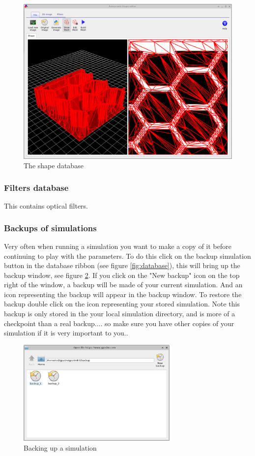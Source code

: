 \begin{figure}[H]
\centering
\includegraphics[width=\textwidth,height=0.7\textwidth]{./images/shape_db.png}
\caption{The shape database}
\label{fig:shapedb}
\end{figure}

\subsubsection{Filters database}
This contains optical filters.

\subsubsection{Backups of simulations}
Very often when running a simulation you want to make a copy of it before continuing to play with the parameters.  To do this click on the backup simulation button in the database ribbon (see figure \ref{fig:database}), this will bring up the backup window, see figure \ref{fig:backup}. If you click on the "New backup" icon on the top right of the window, a backup will be made of your current simulation.  And an icon representing the backup will appear in the backup window.  To restore the backup double click on the icon representing your stored simulation. Note this backup is only stored in the your local simulation directory, and is more of a checkpoint than a real backup.... so make sure you have other copies of your simulation if it is very important to you..

\begin{figure}[H]
\centering
\includegraphics[width=0.7\textwidth]{./images/backup.png}
\caption{Backing up a simulation}
\label{fig:backup}
\end{figure}

